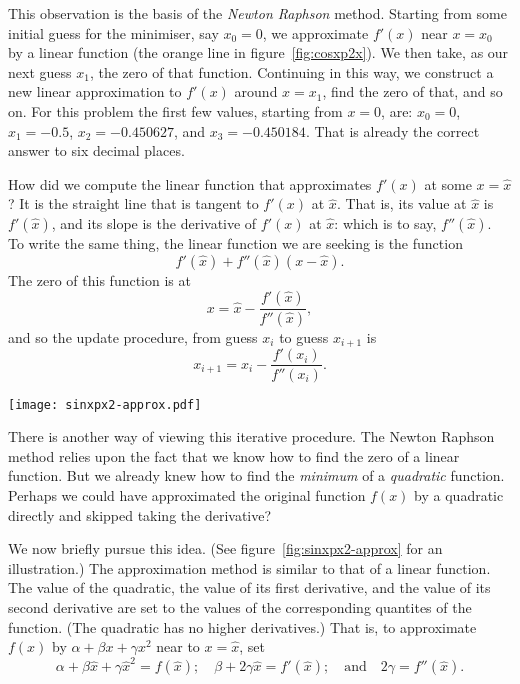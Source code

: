 \documentclass[10pt, a4paper]{article}
\begin{document}
This observation is the basis of the \emph{Newton Raphson}
method. Starting from some initial guess for the minimiser, say
$x_0=0$, we approximate $f'(x)$ near $x=x_0$ by a linear function (the
orange line in figure~\ref{fig:cosxp2x}). We then take, as our next
guess $x_1$, the zero of that function. Continuing in this way, we
construct a new linear approximation to $f'(x)$ around $x=x_1$, find
the zero of that, and so on. For this problem the first few values,
starting from $x=0$, are: $x_0=0$, $x_1=-0.5$, $x_2= -0.450627$, and
$x_3 = -0.450184$. That is already the correct answer to six decimal
places.

How did we compute the linear function that approximates $f'(x)$ at
some $x=\hat{x}$? It is the straight line that is tangent to $f'(x)$
at $\hat{x}$. That is, its value at $\hat{x}$ is $f'(\hat{x})$, and
its slope is the derivative of $f'(x)$ at $\hat{x}$: which is to say,
$f''(\hat{x})$. To write the same thing, the linear function we are
seeking is the function
\begin{equation*}
  f'(\hat{x}) + f''(\hat{x})(x - \hat{x}).
\end{equation*}
The zero of this function is at
\begin{equation}
  x = \hat{x} - \frac{f'(\hat{x})}{f''(\hat{x})},
  \label{eq:linearroot}
\end{equation}
and so the update procedure, from guess $x_i$ to guess $x_{i+1}$ is
\begin{equation}
  x_{i+1} = x_i - \frac{f'(x_i)}{f''(x_i)}.
  \label{eq:newtonraphson}
\end{equation}

\begin{marginfigure}
  \centering
  \texttt{[image: sinxpx2-approx.pdf]}
\end{marginfigure}

There is another way of viewing this iterative procedure. The Newton
Raphson method relies upon the fact that we know how to find the zero
of a linear function. But we already knew how to find the
\emph{minimum} of a \emph{quadratic} function. Perhaps we could have
approximated the original function $f(x)$ by a quadratic directly and
skipped taking the derivative?

We now briefly pursue this idea. (See figure~\ref{fig:sinxpx2-approx}
for an illustration.) The approximation method is similar to that of a
linear function. The value of the quadratic, the value of its first
derivative, and the value of its second derivative are set to the
values of the corresponding quantites of the function. (The quadratic
has no higher derivatives.) That is, to approximate $f(x)$ by
$\alpha+\beta x+\gamma x^2$ near to $x=\hat{x}$, set
\begin{equation*}
  \alpha +\beta\hat{x} + \gamma\hat{x}^2 = f(\hat{x});\quad
  \beta +2\gamma\hat{x} = f'(\hat{x});\quad\text{and}\quad
  2\gamma = f''(\hat{x}).
\end{equation*}
\end{document}

